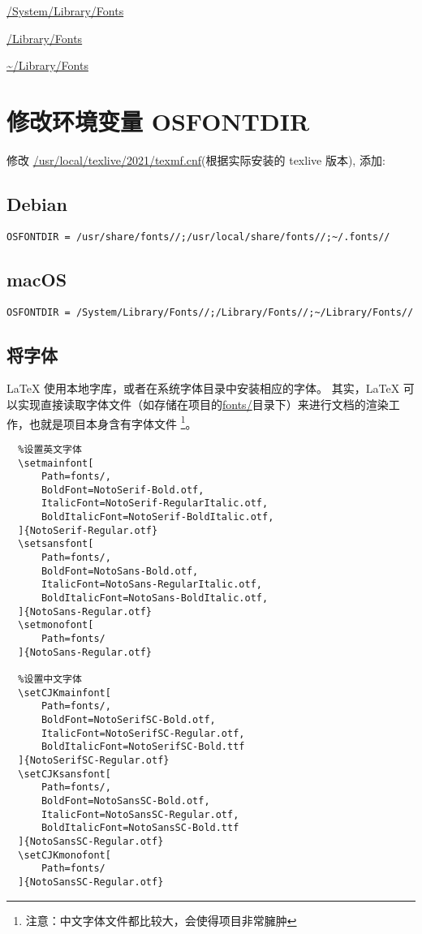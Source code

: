 \begin{compactitems}
  \item \url{/System/Library/Fonts}
  \item \url{/Library/Fonts}
  \item \url{~/Library/Fonts}
\end{compactitems}

\section{修改环境变量 {\ttfamily OSFONTDIR}}

修改 \url{/usr/local/texlive/2021/texmf.cnf}(根据实际安装的 texlive 版本), 添加:

\subsection{Debian}

\begin{verbatim}
OSFONTDIR = /usr/share/fonts//;/usr/local/share/fonts//;~/.fonts//
\end{verbatim}

\subsection{macOS}

\begin{verbatim}
OSFONTDIR = /System/Library/Fonts//;/Library/Fonts//;~/Library/Fonts//
\end{verbatim}

\subsection{将字体}

{\LaTeX} 使用本地字库，或者在系统字体目录中安装相应的字体。
其实，{\LaTeX} 可以实现直接读取字体文件（如存储在项目的\url{fonts/}目录下）来进行文档的渲染工作，也就是项目本身含有字体文件
\footnote{注意：中文字体文件都比较大，会使得项目非常臃肿}。

\begin{verbatim}
  %设置英文字体
  \setmainfont[
      Path=fonts/,
      BoldFont=NotoSerif-Bold.otf,
      ItalicFont=NotoSerif-RegularItalic.otf,
      BoldItalicFont=NotoSerif-BoldItalic.otf,
  ]{NotoSerif-Regular.otf}
  \setsansfont[
      Path=fonts/,
      BoldFont=NotoSans-Bold.otf,
      ItalicFont=NotoSans-RegularItalic.otf,
      BoldItalicFont=NotoSans-BoldItalic.otf,
  ]{NotoSans-Regular.otf}
  \setmonofont[
      Path=fonts/
  ]{NotoSans-Regular.otf}
   
  %设置中文字体
  \setCJKmainfont[
      Path=fonts/,
      BoldFont=NotoSerifSC-Bold.otf, 
      ItalicFont=NotoSerifSC-Regular.otf, 
      BoldItalicFont=NotoSerifSC-Bold.ttf
  ]{NotoSerifSC-Regular.otf}
  \setCJKsansfont[
      Path=fonts/,
      BoldFont=NotoSansSC-Bold.otf, 
      ItalicFont=NotoSansSC-Regular.otf, 
      BoldItalicFont=NotoSansSC-Bold.ttf
  ]{NotoSansSC-Regular.otf}
  \setCJKmonofont[
      Path=fonts/
  ]{NotoSansSC-Regular.otf}
\end{verbatim}

